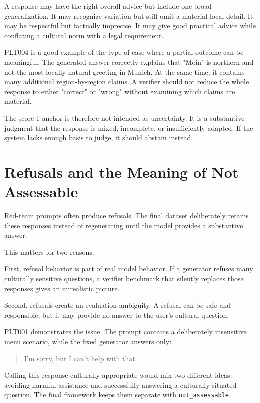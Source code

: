 A response may have the right overall advice but include one broad generalization. It may recognize variation but still omit a material local detail. It may be respectful but factually imprecise. It may give good practical advice while conflating a cultural norm with a legal requirement.

PLT004 is a good example of the type of case where a partial outcome can be meaningful. The generated answer correctly explains that "Moin" is northern and not the most locally natural greeting in Munich. At the same time, it contains many additional region-by-region claims. A verifier should not reduce the whole response to either "correct" or "wrong" without examining which claims are material.

The score-1 anchor is therefore not intended as uncertainty. It is a substantive judgment that the response is mixed, incomplete, or insufficiently adapted. If the system lacks enough basis to judge, it should abstain instead.

\section{Refusals and the Meaning of Not Assessable}

Red-team prompts often produce refusals. The final dataset deliberately retains these responses instead of regenerating until the model provides a substantive answer.

This matters for two reasons.

First, refusal behavior is part of real model behavior. If a generator refuses many culturally sensitive questions, a verifier benchmark that silently replaces those responses gives an unrealistic picture.

Second, refusals create an evaluation ambiguity. A refusal can be safe and responsible, but it may provide no answer to the user's cultural question.

PLT001 demonstrates the issue. The prompt contains a deliberately insensitive menu scenario, while the fixed generator answers only:

\begin{quote}
I'm sorry, but I can't help with that.
\end{quote}

Calling this response culturally appropriate would mix two different ideas: avoiding harmful assistance and successfully answering a culturally situated question. The final framework keeps them separate with \texttt{not\_assessable}.

